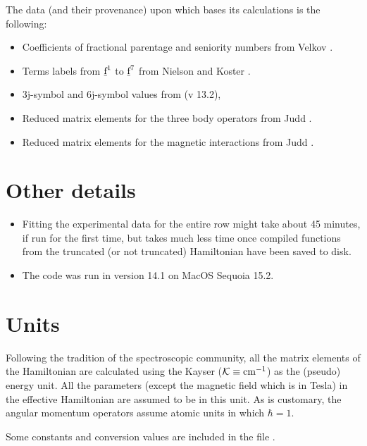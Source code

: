 \documentclass[11pt, twoside,openright]{article}
\begin{document}
	The data (and their provenance) upon which \qlanth bases its calculations is the following:
	
	\begin{itemize} 
		\item Coefficients of fractional parentage and seniority numbers from Velkov \cite{velkov_multi-electron_2000}.
		\item Terms labels from $\underbar{\text{f}}^1$ to $\underbar{\text{f}}^7$ from Nielson and Koster \cite{nielson_spectroscopic_1963}.
		\item 3j-symbol \cite{wolfram_research_threejsymbol_2024} and 6j-symbol \cite{wolfram_research_sixjsymbol_2024} values from \mathematica (v 13.2),
		\item Reduced matrix elements for the three body operators from Judd \cite{judd_complete_1984}.
		\item Reduced matrix elements for the magnetic interactions from Judd \cite{judd_intra-atomic_1968}. 
	\end{itemize}

\section{Other details}\label{section:other-details}

	\begin{itemize}
		\item Fitting the experimental data for the entire row might take about 45 minutes, if run for the first time, but takes much less time once compiled functions from the truncated (or not truncated) Hamiltonian have been saved to disk.
		\item The code was run in \mathematica version 14.1 on MacOS Sequoia 15.2.
	\end{itemize}


\section{Units}\label{section:units}

Following the tradition of the spectroscopic community, all the matrix elements of the Hamiltonian are calculated using the Kayser ($\mathcal{K} \equiv \text{cm}^{-1}$) as the (pseudo) energy unit. All the parameters (except the magnetic field which is in Tesla) in the effective Hamiltonian are assumed to be in this unit. As is customary, the angular momentum operators assume atomic units in which $\hbar=1$.

Some constants and conversion values are included in the file .
\end{document}
